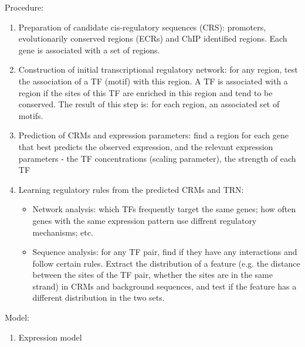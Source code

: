 \documentclass[11pt]{article}
\begin{document}
\begin{enumerate}
Procedure: 
\begin{enumerate}
\item Preparation of candidate cis-regulatory sequences (CRS): promoters, evolutionarily conserved regions (ECRs) and ChIP identified regions. Each gene is associated with a set of regions. 
\item Construction of initial transcriptional regulatory network: for any region, test the association of a TF (motif) with this region. A TF is associated with a region if the sites of this TF are enriched in this region and tend to be conserved. The result of this step is: for each region, an associated set of motifs. 
\item Prediction of CRMs and expression parameters: find a region for each gene that best predicts the observed expression, and the relevant expression parameters - the TF concentrations (scaling parameter), the strength of each TF
\item Learning regulatory rules from the predicted CRMs and TRN: 
\begin{itemize}
\item Network analysis: which TFs frequently target the same genes; how often genes with the same expression pattern use diffrent regulatory mechanisms; etc. 
\item Sequence analysis: for any TF pair, find if they have any interactions and follow certain rules. Extract the distribution of a feature (e.g. the distance between the sites of the TF pair, whether the sites are in the same strand) in CRMs and background sequences, and test if the feature has a different distribution in the two sets. 
\end{itemize}
\end{enumerate}

Model: 
\begin{enumerate}
\item{Expression model} 


\end{enumerate}
\end{enumerate}
\end{document}
